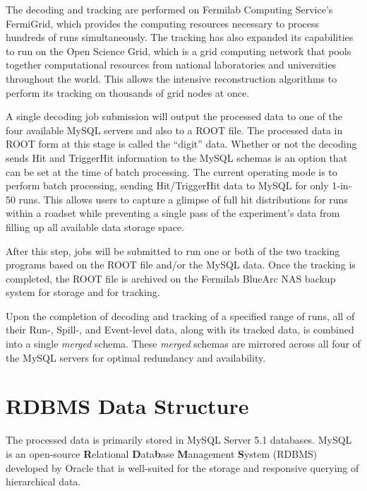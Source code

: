 The decoding and tracking are performed on Fermilab Computing Service's FermiGrid, which provides the computing resources necessary to process hundreds of runs simultaneously. The tracking has also expanded its capabilities to run on the Open Science Grid, which is a grid computing network that pools together computational resources from national laboratories and universities throughout the world\cite{osg:doc}. This allows the intensive reconstruction algorithms to perform its tracking on thousands of grid nodes at once.

A single decoding job submission will output the processed data to one of the four available MySQL servers and also to a ROOT file. The processed data in ROOT form at this stage is called the ``digit'' data. Whether or not the decoding sends Hit and TriggerHit information to the MySQL schemas is an option that can be set at the time of batch processing. The current operating mode is to perform batch processing, sending Hit/TriggerHit data to MySQL for only 1-in-50 runs. This allows users to capture a glimpse of full hit distributions for runs within a roadset while preventing a single pass of the experiment's data from filling up all available data storage space.

After this step, jobs will be submitted to run one or both of the two tracking programs based on the ROOT file and/or the MySQL data. Once the tracking is completed, the ROOT file is archived on the Fermilab BlueArc NAS backup system for storage and for tracking.

Upon the completion of decoding and tracking of a specified range of runs, all of their Run-, Spill-, and Event-level data, along with its tracked data, is combined into a single \emph{merged} schema. These \emph{merged} schemas are mirrored across all four of the MySQL servers for optimal redundancy and availability.

\section{RDBMS Data Structure}

The processed data is primarily stored in MySQL Server 5.1 databases. MySQL is an open-source \textbf{R}elational \textbf{D}ata\textbf{b}ase \textbf{M}anagement \textbf{S}ystem (RDBMS) developed by Oracle that is well-suited for the storage and responsive querying of hierarchical data.

